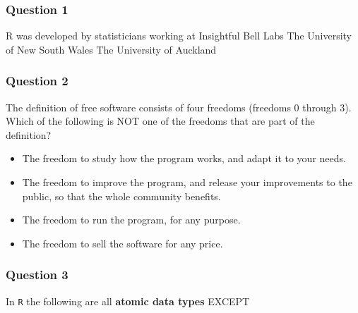 

\begin{frame}
\frametitle{Question 1}
\Large
R was developed by statisticians working at
Insightful
Bell Labs
The University of New South Wales
The University of Auckland
\end{frame}
\begin{frame}
\frametitle{Question 2}
\Large
The definition of free software consists of four freedoms (freedoms 0 through 3). \\ Which of the following is NOT one of the freedoms that are part of the definition?
\begin{itemize}
\item The freedom to study how the program works, and adapt it to your needs.
\item The freedom to improve the program, and release your improvements to the public, so that the whole community benefits.
\item The freedom to run the program, for any purpose.
\item The freedom to sell the software for any price.
\end{itemize}
\end{frame}
\begin{frame}
\frametitle{Question 3}
\Large
In \texttt{R} the following are all \textbf{atomic data types} EXCEPT
\end{frame}
